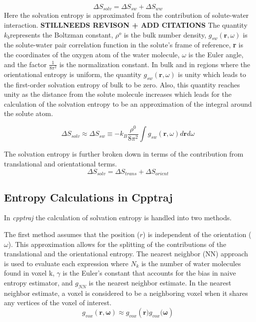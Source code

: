 \documentclass[9pt,tutorial]{livecoms}
\newcommand{\software}{\emph}
\begin{document}
\begin{equation}
	\Delta S_\textit{solv} = \Delta S_\textit{sw} + \Delta S_\textit{ww}
\end{equation}
Here the solvation entropy is approximated from the contribution of solute-water interaction. 
\textbf{STILLNEEDS REVISON + ADD CITATIONS} The quantity $k_\textit{b}$represents the Boltzman constant, 
$\rho^\textit{o}$ is the bulk number density, $g_\textit{sw}\left(\textbf{r},\omega \right)$ is the solute-water 
pair correlation function in the solute's frame of reference, \textbf{r} is the coordinates of the oxygen atom of the water molecule,  
$\omega$ is the Euler angle, and the factor $\frac{1}{8\pi^2}$ is the normalization constant. In bulk and in regions where the orientational 
entropy is uniform, the quantity $g_\textit{sw}\left(\textbf{r},\omega \right)$ is unity which leads to the first-order solvation entropy of 
bulk to be zero. Also, this quantity reaches unity as the distance from the solute molecule increases which leads for the calculation of 
the solvation entropy to be an approximation of the integral around the solute atom. 

\begin{equation}
	\Delta S_\textit{solv} \approx \Delta S_\textit{sw} \equiv -k_\textit{B} \frac{\rho^\textit{0}}{8\pi^\textit{2}} \int g_\textit{sw} \left(\textbf{r}, \omega \right) d\textbf{r}d\omega
\end{equation}

The solvation entropy is further broken down in terms of the contribution from translational and orientational terms.
\begin{equation}
	\Delta S_\textit{solv} = \Delta S_\textit{trans} + \Delta S_\textit{orient}
\end{equation}

\subsection{Entropy Calculations in Cpptraj}
In \software{cpptraj} the calculation of  solvation entropy is handled into two methods.

The first method assumes that the position ($r$) is independent of the orientation ($\omega$). This approximation allows for the 
splitting of the contributions of the translational and the orientational entropy. The nearest neighbor (NN) approach is used to 
evaluate each expression where $N_\textit{k}$ is the number of water molecules found in voxel k, $\gamma$ is the Euler's constant 
that accounts for the bias in naive entropy estimator, and $g_\textit{NN}$ is the nearest neighbor estimate. In the nearest neighbor
estimate, a voxel is considered to be a neighboring voxel when it shares any vertices of the voxel of interest. 
\begin{equation}
	g_\textit{vox} \left( \textbf{r}, \mathbf{\omega} \right) \approx g_\textit{vox} \left( \textbf{r})g_\textit{vox}(\mathbf{\omega} \right)
\end{equation}
\end{document}
